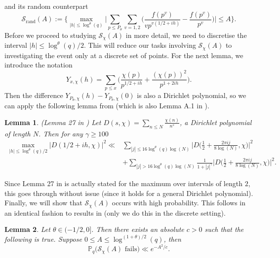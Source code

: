 \documentclass[reqno]{amsart}
\newtheorem{lemma}{Lemma}
\theoremstyle{definition}
\theoremstyle{remark}
\numberwithin{equation}{section}
\theoremstyle{remark}
\begin{document}
and its random counterpart
\begin{equation}
    \mathcal{S}_{\text{rand}}(A) :=\big\{\max_{|h| \leq \log^{\theta}(q)}\big|\sum_{p \leq P_\theta}\sum_{v=1,2}\big(\frac{f(p^v)}{vp^{v(1/2+ih)}}-\frac{f(p^v)}{p^{v}}\big) \big| \leq A\big\}. \label{central_rand_shift}
\end{equation}
Before we proceed to studying $\mathcal{S}_\chi(A)$ in more detail, we need to discretise the interval $|h| \leq \log^{\theta}(q)/2$. This will reduce our tasks involving $\mathcal{S}_\chi(A)$ to investigating the event only at a discrete set of points. For the next lemma, we introduce the notation
$$Y_{x,\chi}(h) = \sum_{p \leq x}\big(\frac{\chi(p)}{p^{1/2+ih}}+\frac{(\chi(p))^2}{p^{1+2ih}}\big).$$ Then the difference $Y_{P_\theta,\chi}(h)-Y_{P_\theta,\chi}(0)$ is also a Dirichlet polynomial, so we can apply the following lemma from \cite{abr20} (which is also Lemma A.1 in \cite{ah24}).
\begin{lemma}
    (Lemma 27 in \cite{abr20}) Let $D(s,\chi) = \sum_{n \leq N}\frac{\chi(n)}{n^s}$, a Dirichlet polynomial of length $N$. Then for any $\gamma \geq 100$
    \begin{equation*}\begin{split}\max_{|h| \leq \log^\theta(q)/2}|D(1/2+ih,\chi)|^2 \ll&\sum_{|j| \leq 16\log^\theta(q)\log(N)}\big|D\big(\frac{1}{2}+\frac{2\pi i j}{8\log(N)},\chi \big)\big|^2 \\
    &+ \sum_{|j| > 16\log^\theta(q)\log(N)}\frac{1}{1+|j|^\gamma}\big|D\big(\frac{1}{2}+\frac{2\pi i j}{8\log(N)},\chi \big)\big|^2.\end{split}
    \end{equation*}
\end{lemma}
Since Lemma 27 in \cite{abr20} is actually stated for the maximum over intervals of length $2$, this goes through without issue (since it holds for a general Dirichlet polynomial). Finally, we will show that $\mathcal{S}_\chi(A)$ occurs with high probability. This follows in an identical fashion to results in \cite{ah24} (only we do this in the discrete setting).
\begin{lemma}
    Let $\theta \in (-1/2,0]$. Then there exists an absolute $c>0$ such that the following is true. Suppose $0 \leq A\leq \log^{(1+\theta)/2}(q)$, then
    $$\mathbb{P}_q\big(\mathcal{S}_\chi(A) \text{ fails}\big) \ll e^{-A^2/c}.$$ \label{char_chaining}
\end{lemma}
\end{document}
